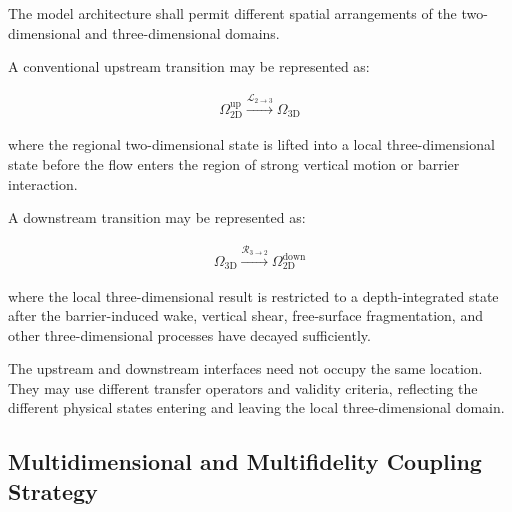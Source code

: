 The model architecture shall permit different spatial arrangements of
the two-dimensional and three-dimensional domains.

A conventional upstream transition may be represented as:

\begin{align}
  \Omega_{\mathrm{2D}}^{\mathrm{up}}
  \xrightarrow{\mathcal{L}_{2\rightarrow3}}
  \Omega_{\mathrm{3D}}
  \label{eq:res-mod-mul-upstream-transition}
\end{align}

where the regional two-dimensional state is lifted into a local
three-dimensional state before the flow enters the region of strong
vertical motion or barrier interaction.

A downstream transition may be represented as:

\begin{align}
  \Omega_{\mathrm{3D}}
  \xrightarrow{\mathcal{R}_{3\rightarrow2}}
  \Omega_{\mathrm{2D}}^{\mathrm{down}}
  \label{eq:res-mod-mul-downstream-transition}
\end{align}

where the local three-dimensional result is restricted to a
depth-integrated state after the barrier-induced wake, vertical shear,
free-surface fragmentation, and other three-dimensional processes have
decayed sufficiently.

The upstream and downstream interfaces need not occupy the same
location. They may use different transfer operators and validity
criteria, reflecting the different physical states entering and leaving
the local three-dimensional domain.

\subsection{Multidimensional and Multifidelity Coupling Strategy}
\label{sec:res-mod-mul-coupling-strategy}

